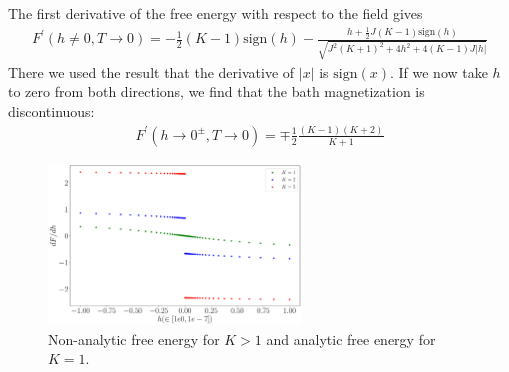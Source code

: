 \documentclass[12pt]{revtex4-2}
\begin{document}
The first derivative of the free energy with respect to the field gives
\begin{equation}\begin{aligned}
	F^\prime(h\neq 0, T\to 0) = - \frac{1}{2}(K-1)\text{sign}(h) - \frac{h + \frac{1}{2}J(K-1)\text{sign}(h)}{\sqrt{J^2(K+1)^2 + 4h^2 + 4\left(K-1\right) J |h|}}
\end{aligned}\end{equation}
There we used the result that the derivative of \(|x|\) is \(\text{sign}(x)\). If we now take \(h\) to zero from both directions, we find that the bath magnetization is discontinuous:
\begin{equation}\begin{aligned}
	F^\prime(h \to 0^\pm, T\to 0) = \mp \frac{1}{2}\frac{(K-1)(K+2)}{K+1}
\end{aligned}\end{equation}
\begin{figure}[htpb]
	\centering
	\includegraphics[width=0.6\textwidth]{../numerics/disc_mag_bath.pdf}
	\caption{Non-analytic free energy for \(K>1\) and analytic free energy for \(K=1\).}
\end{figure}
\end{document}
